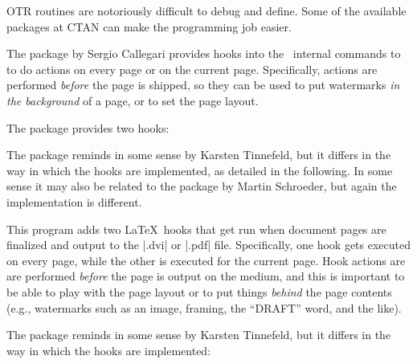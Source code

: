 OTR routines are notoriously difficult to debug and define. Some of the available packages at CTAN
can make the programming job easier.

The  package by Sergio Callegari provides hooks into the \latex\ internal commands to
to do actions on every page or on the current page. Specifically, actions  are performed \emph{before} the page is shipped, so they can be used to put watermarks \emph{in the background} of a page, or to
set the page layout. 

The package provides two hooks:

\begin{teXXX}
  \AddThisPageHook
\end{teXXX}

The package reminds in some sense
 by Karsten Tinnefeld, but it differs in the way in
 which the hooks are implemented, as detailed in the following.
 In some sense it may also be related to the package
  by Martin Schroeder, but again the implementation
 is different.

 
 This program adds two \LaTeX\ hooks that get run when document
 pages are finalized and output to the |.dvi| or |.pdf|
 file. Specifically, one hook gets executed on every page, while the
 other is executed for the current page. Hook actions are are performed
 \emph{before} the page is output on the medium, and this is
 important to be able to play with the page layout or to put things
 \emph{behind} the page contents (e.g., watermarks such as an image,
 framing, the ``DRAFT'' word, and the like).
 
 The package reminds in some sense  by Karsten
 Tinnefeld, but it differs in the way in which the hooks are
 implemented:
 


